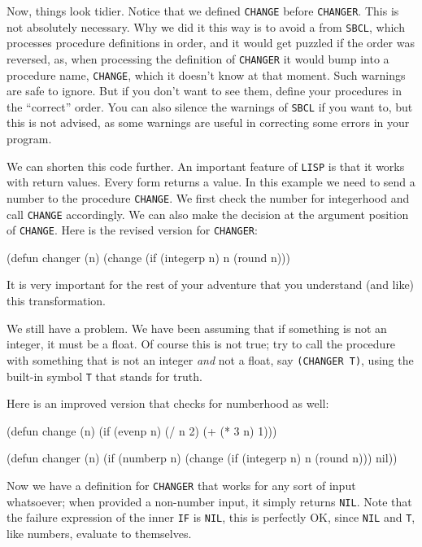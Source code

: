 \documentclass[a4paper,11pt]{article}
\begin{document}
\begin{uenum}
\begin{uenumi}
Now, things look tidier. Notice that we defined \Verb+CHANGE+ before \Verb+CHANGER+. This is not absolutely necessary. Why we did it this way is to avoid a  from \Verb+SBCL+, which processes procedure definitions in order, and it would get puzzled if the order was reversed, as, when processing the definition of \Verb+CHANGER+ it would bump into a procedure name, \Verb+CHANGE+, which it doesn't know at that moment. Such warnings are safe to ignore. But if you don't want to see them, define your procedures in the ``correct'' order. You can also silence the warnings of \Verb+SBCL+ if you want to, but this is not advised, as some warnings are useful in correcting some errors in your program.

\item We can shorten this code further. An important feature of \Verb+LISP+ is that it works with return values. Every form returns a value. In this example we need to send a number to the procedure \Verb+CHANGE+. We first check the number for integerhood and call \Verb+CHANGE+ accordingly. We can also make the decision at the argument position of \Verb+CHANGE+. Here is the revised version for \Verb+CHANGER+:

\begin{lispcode}
(defun changer (n)
  (change (if (integerp n)
              n
              (round n)))
\end{lispcode}

It is very important for the rest of your adventure that you understand (and like) this transformation.


\item We still have a problem. We have been assuming that if something is not an integer, it must be a float. Of course this is not true; try to call the procedure with something that is not an integer \emph{and} not a float, say \Verb+(CHANGER T)+, using the built-in symbol \Verb+T+ that stands for truth.

\item Here is an improved version that checks for numberhood as well:

\begin{lispcode}
(defun change (n)
  (if (evenp n)
    (/ n 2)
    (+ (* 3 n) 1)))

(defun changer (n)
  (if (numberp n)
      (change (if (integerp n)
                  n
                  (round n)))
      nil))
\end{lispcode}

Now we have a definition for \Verb+CHANGER+ that works for any sort of input whatsoever; when provided a non-number input, it simply returns \Verb+NIL+.  Note that the failure expression of the inner \Verb+IF+ is \Verb+NIL+, this is perfectly OK, since \Verb+NIL+ and \Verb+T+, like numbers, evaluate to themselves.


\end{uenumi}
\end{uenum}
\end{document}
